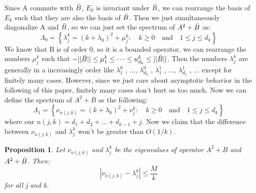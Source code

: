 \documentclass[10pt]{amsart}
\newtheorem{proposition}[theorem]{Proposition}
\newcommand{\1}{\mathbb{1}}
\begin{document}
Since A commute with $\Bar{B}$, $E_k$ is invariant under $\Bar{B}$, we can rearrange the basis of $E_k$ such that they are also the basis of $\Bar{B}$. Then we just simultaneously diagonalize A and $\Bar{B}$, so we can just set the spectrum of $A^2 + \Bar{B}$ as:
\begin{equation*}
     \Lambda_0 = \left\{\lambda_j^k = (k+\lambda_0)^2 + \mu_j^k: \quad k \geq 0 \quad \textrm{and} \quad 1 \leq j \leq d_k \right\}
\end{equation*}
We know that B is of order 0, so it is a bounded operator, we can rearrange the numbers $\mu_j^k$ such that $-||\Bar{B}|| \leq \mu_1^k \leq \dots \leq u_{d_{k}}^k \leq ||\Bar{B}||$. Then the numbers $\lambda_j^k$ are generally in a increasingly order like $\lambda_1^0$ , $\dots$, $\lambda_{d_0}^0$ , $\lambda_1^1$ , $\dots$, $\lambda_{d_1}^1$ , $\dots$ except for finitely many cases. However, since we just care about asymptotic behavior in the following of this paper, finitely many cases don't hurt us too much. Now we can define the spectrum of $A^2 + B$ as the following:
\begin{equation*}
     \Lambda_1 = \left\{\nu_{n(j,k)} = (k+\lambda_0)^2 + \nu_j^k: \quad k \geq 0 \quad \textrm{and} \quad 1 \leq j \leq d_k \right\}
\end{equation*}
where our $n(j,k) = d_1 + d_2 + \dots + d_{k-1} + j$. Now we claim that the difference between $\nu_{n(j,k)}$ and $\lambda_j^k$ won't be greater than $O(1/k)$. 
\begin{proposition}\label{difference}
    Let $\nu_{n(j,k)}$ and $\lambda_j^k$ be the eigenvalues of operator $A^2+B$ and $A^2+\Bar{B}$. Then:
    \begin{equation}
        |\nu_{n(j,k)} - \lambda_j^k | \leq \frac{M}{k}
    \end{equation}
    for all j and k.
\end{proposition}
\end{document}

